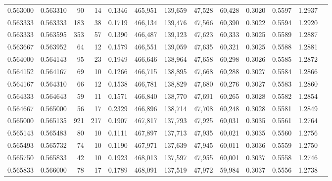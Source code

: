 \begin{tabular}{rrrrrrrrrrrrr}
0.563000 & 0.563310 &    90 &  14 &                                     0.1346 & 465,951 & 139,659 &  47,528 &  60,428 & 0.3020 & 0.5597 & 1.2937 \\
0.563333 & 0.563333 &   183 &  38 &                                     0.1719 & 466,134 & 139,476 &  47,566 &  60,390 & 0.3022 & 0.5594 & 1.2920 \\
0.563333 & 0.563595 &   353 &  57 &                                     0.1390 & 466,487 & 139,123 &  47,623 &  60,333 & 0.3025 & 0.5589 & 1.2887 \\
0.563667 & 0.563952 &    64 &  12 &                                     0.1579 & 466,551 & 139,059 &  47,635 &  60,321 & 0.3025 & 0.5588 & 1.2881 \\
0.564000 & 0.564143 &    95 &  23 &                                     0.1949 & 466,646 & 138,964 &  47,658 &  60,298 & 0.3026 & 0.5585 & 1.2872 \\
0.564152 & 0.564167 &    69 &  10 &                                     0.1266 & 466,715 & 138,895 &  47,668 &  60,288 & 0.3027 & 0.5584 & 1.2866 \\
0.564167 & 0.564310 &    66 &  12 &                                     0.1538 & 466,781 & 138,829 &  47,680 &  60,276 & 0.3027 & 0.5583 & 1.2860 \\
0.564333 & 0.564643 &    59 &  11 &                                     0.1571 & 466,840 & 138,770 &  47,691 &  60,265 & 0.3028 & 0.5582 & 1.2854 \\
0.564667 & 0.565000 &    56 &  17 &                                     0.2329 & 466,896 & 138,714 &  47,708 &  60,248 & 0.3028 & 0.5581 & 1.2849 \\
0.565000 & 0.565135 &   921 & 217 &                                     0.1907 & 467,817 & 137,793 &  47,925 &  60,031 & 0.3035 & 0.5561 & 1.2764 \\
0.565143 & 0.565483 &    80 &  10 &                                     0.1111 & 467,897 & 137,713 &  47,935 &  60,021 & 0.3035 & 0.5560 & 1.2756 \\
0.565493 & 0.565732 &    74 &  10 &                                     0.1190 & 467,971 & 137,639 &  47,945 &  60,011 & 0.3036 & 0.5559 & 1.2750 \\
0.565750 & 0.565833 &    42 &  10 &                                     0.1923 & 468,013 & 137,597 &  47,955 &  60,001 & 0.3037 & 0.5558 & 1.2746 \\
0.565833 & 0.566000 &    78 &  17 &                                     0.1789 & 468,091 & 137,519 &  47,972 &  59,984 & 0.3037 & 0.5556 & 1.2738 \\

\end{tabular}
